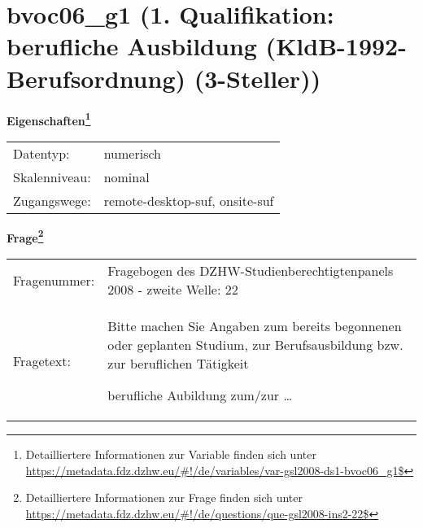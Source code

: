 
    \setcounter{footnote}{0}

    \vspace*{-1.8cm}
	\section{bvoc06\_g1 (1. Qualifikation: berufliche Ausbildung (KldB-1992-Berufsordnung) (3-Steller))}
	\label{section:bvoc06_g1}



    \vspace*{0.5cm}
    \noindent\textbf{Eigenschaften\footnote{Detailliertere Informationen zur Variable finden sich unter
		\url{https://metadata.fdz.dzhw.eu/\#!/de/variables/var-gsl2008-ds1-bvoc06_g1$}}}\\
	\begin{tabularx}{\hsize}{@{}lX}
	Datentyp: & numerisch \\
	Skalenniveau: & nominal \\
	Zugangswege: &
	  remote-desktop-suf, 
	  onsite-suf
 \\
    \end{tabularx}



				\vspace*{0.5cm}
                \noindent\textbf{Frage\footnote{Detailliertere Informationen zur Frage finden sich unter
		              \url{https://metadata.fdz.dzhw.eu/\#!/de/questions/que-gsl2008-ins2-22$}}}\\
				\begin{tabularx}{\hsize}{@{}lX}
					Fragenummer: &
					  Fragebogen des DZHW-Studienberechtigtenpanels 2008 - zweite Welle:
					  22
 \\
					Fragetext: & Bitte machen Sie Angaben zum bereits begonnenen oder geplanten Studium, zur Berufsausbildung bzw. zur beruflichen Tätigkeit\par  berufliche Aubildung zum/zur … \\
				\end{tabularx}






